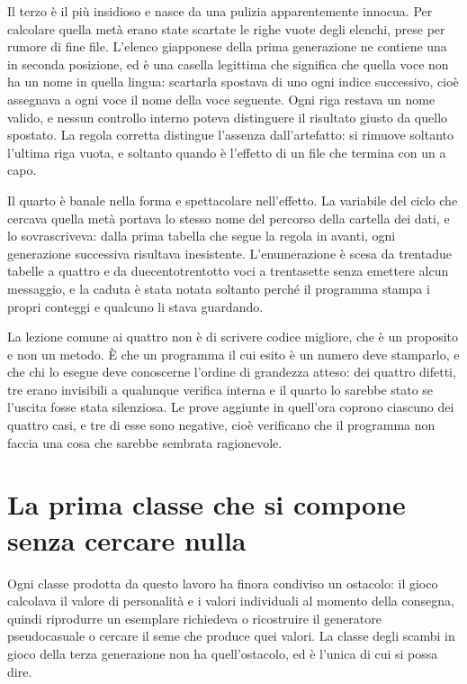Il terzo è il più insidioso e nasce da una pulizia apparentemente innocua. Per calcolare quella metà erano state scartate le righe vuote degli elenchi, prese per rumore di fine file. L'elenco giapponese della prima generazione ne contiene una in seconda posizione, ed è una casella legittima che significa che quella voce non ha un nome in quella lingua: scartarla spostava di uno ogni indice successivo, cioè assegnava a ogni voce il nome della voce seguente. Ogni riga restava un nome valido, e nessun controllo interno poteva distinguere il risultato giusto da quello spostato. La regola corretta distingue l'assenza dall'artefatto: si rimuove soltanto l'ultima riga vuota, e soltanto quando è l'effetto di un file che termina con un a capo.

Il quarto è banale nella forma e spettacolare nell'effetto. La variabile del ciclo che cercava quella metà portava lo stesso nome del percorso della cartella dei dati, e lo sovrascriveva: dalla prima tabella che segue la regola in avanti, ogni generazione successiva risultava inesistente. L'enumerazione è scesa da trentadue tabelle a quattro e da duecentotrentotto voci a trentasette senza emettere alcun messaggio, e la caduta è stata notata soltanto perché il programma stampa i propri conteggi e qualcuno li stava guardando.

La lezione comune ai quattro non è di scrivere codice migliore, che è un proposito e non un metodo. È che un programma il cui esito è un numero deve stamparlo, e che chi lo esegue deve conoscerne l'ordine di grandezza atteso: dei quattro difetti, tre erano invisibili a qualunque verifica interna e il quarto lo sarebbe stato se l'uscita fosse stata silenziosa. Le prove aggiunte in quell'ora coprono ciascuno dei quattro casi, e tre di esse sono negative, cioè verificano che il programma non faccia una cosa che sarebbe sembrata ragionevole.

\section{La prima classe che si compone senza cercare nulla}

Ogni classe prodotta da questo lavoro ha finora condiviso un ostacolo: il gioco calcolava il valore di personalità e i valori individuali al momento della consegna, quindi riprodurre un esemplare richiedeva o ricostruire il generatore pseudocasuale o cercare il seme che produce quei valori. La classe degli scambi in gioco della terza generazione non ha quell'ostacolo, ed è l'unica di cui si possa dire.

